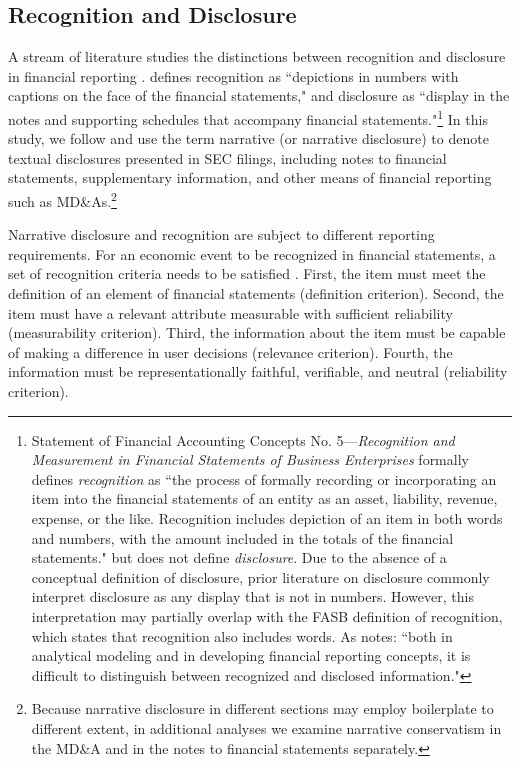 \documentclass[letterpaper,12pt]{article}
\begin{document}
\begin{spacing}{1.5}
\subsection{Recognition and Disclosure}
\noindent A stream of literature studies the distinctions between recognition and disclosure in financial reporting \cite{aboodyRecognitionDisclosureOil1996, barthMarketEffectsRecognition2003, schipperRequiredDisclosuresFinancial2007}.  defines recognition as ``depictions in numbers with captions on the face of the financial statements," and disclosure as ``display in the notes and supporting schedules that accompany financial statements."\footnote{Statement of Financial Accounting Concepts No. 5---\textit{Recognition and Measurement in Financial Statements of Business Enterprises} formally defines \textit{recognition} as ``the process of formally recording or incorporating an item into the financial statements of an entity as an asset, liability, revenue, expense, or the like. Recognition includes depiction of an item in both words and numbers, with the amount included in the totals of the financial statements." \cite[par. 6]{fasbStatementFinancialAccounting1984} but does not define \textit{disclosure}. Due to the absence of a conceptual definition of disclosure, prior literature on disclosure commonly interpret disclosure as any display that is not in numbers. However, this interpretation may partially overlap with the FASB definition of recognition, which states that recognition also includes words. As  notes: ``both in analytical modeling and in developing financial reporting concepts, it is difficult to distinguish between recognized and disclosed information."} In this study, we follow  and use the term narrative (or narrative disclosure) to denote textual disclosures presented in SEC filings, including notes to financial statements, supplementary information, and other means of financial reporting such as MD\&As.\footnote{Because narrative disclosure in different sections may employ boilerplate to different extent, in additional analyses we examine narrative conservatism in the MD\&A and in the notes to financial statements separately.}

Narrative disclosure and recognition are subject to different reporting requirements. For an economic event to be recognized in financial statements, a set of recognition criteria needs to be satisfied \cite{fasbStatementFinancialAccounting1984}. First, the item must meet the definition of an element of financial statements (definition criterion). Second, the item must have a relevant attribute measurable with sufficient reliability (measurability criterion). Third, the information about the item must be capable of making a difference in user decisions (relevance criterion). Fourth, the information must be representationally faithful, verifiable, and neutral (reliability criterion). 


\end{spacing}
\end{document}

